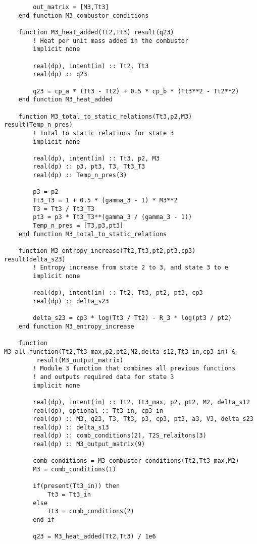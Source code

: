 \begin{verbatim}
        out_matrix = [M3,Tt3]
    end function M3_combustor_conditions

    function M3_heat_added(Tt2,Tt3) result(q23)
        ! Heat per unit mass added in the combustor
        implicit none

        real(dp), intent(in) :: Tt2, Tt3
        real(dp) :: q23

        q23 = cp_a * (Tt3 - Tt2) + 0.5 * cp_b * (Tt3**2 - Tt2**2)
    end function M3_heat_added

    function M3_total_to_static_relations(Tt3,p2,M3) result(Temp_n_pres)
        ! Total to static relations for state 3
        implicit none

        real(dp), intent(in) :: Tt3, p2, M3
        real(dp) :: p3, pt3, T3, Tt3_T3
        real(dp) :: Temp_n_pres(3)

        p3 = p2
        Tt3_T3 = 1 + 0.5 * (gamma_3 - 1) * M3**2
        T3 = Tt3 / Tt3_T3
        pt3 = p3 * Tt3_T3**(gamma_3 / (gamma_3 - 1))
        Temp_n_pres = [T3,p3,pt3]
    end function M3_total_to_static_relations

    function M3_entropy_increase(Tt2,Tt3,pt2,pt3,cp3) result(delta_s23)
        ! Entropy increase from state 2 to 3, and state 3 to e
        implicit none

        real(dp), intent(in) :: Tt2, Tt3, pt2, pt3, cp3
        real(dp) :: delta_s23

        delta_s23 = cp3 * log(Tt3 / Tt2) - R_3 * log(pt3 / pt2)
    end function M3_entropy_increase

    function M3_all_function(Tt2,Tt3_max,p2,pt2,M2,delta_s12,Tt3_in,cp3_in) &
         result(M3_output_matrix)
        ! Module 3 function that combines all previous functions
        ! and outputs required data for state 3
        implicit none

        real(dp), intent(in) :: Tt2, Tt3_max, p2, pt2, M2, delta_s12
        real(dp), optional :: Tt3_in, cp3_in
        real(dp) :: M3, q23, T3, Tt3, p3, cp3, pt3, a3, V3, delta_s23
        real(dp) :: delta_s13
        real(dp) :: comb_conditions(2), T2S_relaitons(3)
        real(dp) :: M3_output_matrix(9)

        comb_conditions = M3_combustor_conditions(Tt2,Tt3_max,M2)
        M3 = comb_conditions(1)

        if(present(Tt3_in)) then
            Tt3 = Tt3_in
        else
            Tt3 = comb_conditions(2)
        end if

        q23 = M3_heat_added(Tt2,Tt3) / 1e6


\end{verbatim}
